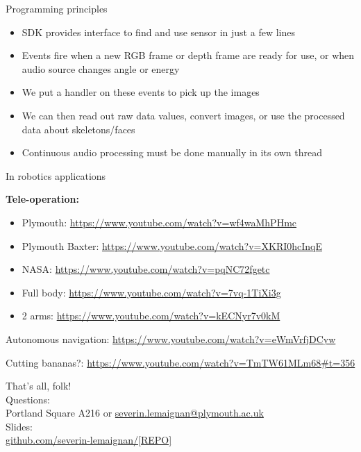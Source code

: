 \documentclass[compress]{beamer}
\providecommand{\tightlist}{%
  \setlength{\itemsep}{0pt}\setlength{\parskip}{0pt}}
\begin{document}
\begin{frame}{Programming principles}

\begin{itemize}
\tightlist
\item
  SDK provides interface to find and use sensor in just a few lines
\item
  Events fire when a new RGB frame or depth frame are ready for use, or
  when audio source changes angle or energy
\item
  We put a handler on these events to pick up the images
\item
  We can then read out raw data values, convert images, or use the
  processed data about skeletons/faces
\item
  Continuous audio processing must be done manually in its own thread
\end{itemize}

\end{frame}

\begin{frame}{In robotics applications}

\textbf{Tele-operation:}

\begin{itemize}
\tightlist
\item
  Plymouth: \url{https://www.youtube.com/watch?v=wf4waMhPHmc}
\item
  Plymouth Baxter: \url{https://www.youtube.com/watch?v=XKRI0hcInqE}
\item
  NASA: \url{https://www.youtube.com/watch?v=pqNC72fgetc}
\item
  Full body: \url{https://www.youtube.com/watch?v=7vq-1TiXi3g}
\item
  2 arms: \url{https://www.youtube.com/watch?v=kECNyr7v0kM}
\end{itemize}

Autonomous navigation: \url{https://www.youtube.com/watch?v=eWmVrfjDCyw}

Cutting bananas?:
\url{https://www.youtube.com/watch?v=TmTW61MLm68\#t=356}

\end{frame}


\begin{frame}{}
    \begin{center}
        \Large
        That's all, folk!\\[2em]
        \normalsize
        Questions:\\
        Portland Square A216 or \url{severin.lemaignan@plymouth.ac.uk} \\[1em]

        Slides:\\ \url{github.com/severin-lemaignan/[REPO]}

    \end{center}
\end{frame}
\end{document}
